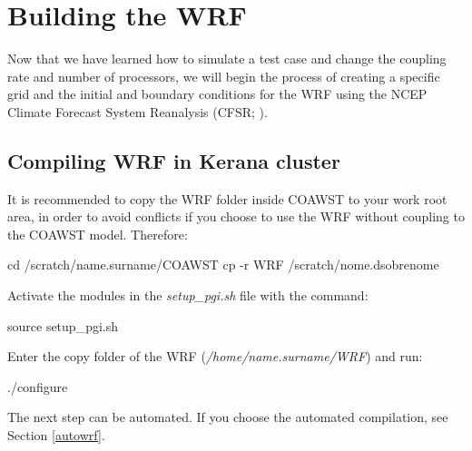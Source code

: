 \chapter{Building the WRF}
\bigskip 
\noindent Now that we have learned how to simulate a test case and change the coupling rate and number of processors, we will begin 
the process of creating a specific grid and the initial and boundary conditions for the WRF using the NCEP Climate Forecast System Reanalysis (CFSR; \cite{Saha2006}).
\bigskip

\section{Compiling WRF in Kerana cluster}
\bigskip
\noindent It is recommended to copy the WRF folder inside COAWST to your work root area, in order to avoid conflicts
if you choose to use the WRF without coupling to the COAWST model. Therefore:\bigskip

\begin{bashcode}
cd /scratch/name.surname/COAWST
cp -r WRF /scratch/nome.dsobrenome
\end{bashcode}
\bigskip

\noindent Activate the modules in the \textit{setup\_pgi.sh} file with the command:
\bigskip
\begin{bashcode}
source setup_pgi.sh
\end{bashcode}
\bigskip

\noindent Enter the copy folder of the WRF (\textit{/home/name.surname/WRF}) and run:
\bigskip

\begin{bashcode}
./configure
\end{bashcode}
\bigskip

\begin{tcolorbox}[enhanced,
  grow to left by=0cm,%
  grow to right by=0cm,%
  enlarge top by=0cm,%
  enlarge bottom by=0cm,%
  tcbox raise base,
  boxrule=1.0pt,
  left=18mm,
  colframe=red!50!black,coltext=red!25!black,colback=red!10!white,
  overlay={\begin{tcbclipinterior}\fill[red!75!blue!50!white] (frame.south west)
    rectangle node[text=white,font=\sffamily\bfseries\footnotesize,rotate=0] {WARNING} ([xshift=18mm]frame.north west);\end{tcbclipinterior}}]
The next step can be automated. If you choose the automated compilation, see Section \textcolor{bleu_cite}{\ref{autowrf}}.
\end{tcolorbox}
\bigskip


